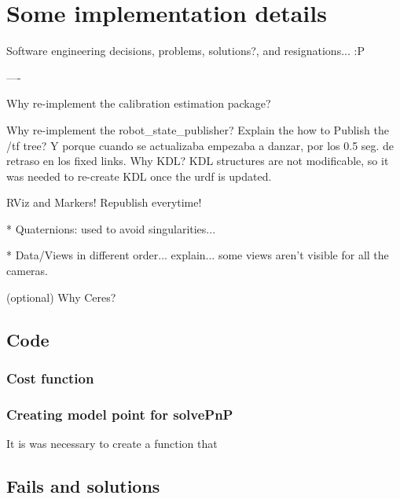 \chapter{Some implementation details}
\label{cha:implementation}

Software engineering decisions, problems, solutions?, and resignations... :P


----

Why re-implement the calibration estimation package?

Why re-implement the robot\_state\_publisher? Explain the how to Publish the /tf tree?
Y porque cuando se actualizaba empezaba a danzar, por los 0.5 seg. de retraso en los fixed links.
Why KDL? KDL structures are not modificable, so it was needed to re-create KDL once the urdf is updated.

RViz and Markers! Republish everytime!

* Quaternions: used to avoid singularities...

* Data/Views in different order... explain... some views aren't visible for all the cameras.

(optional)
Why Ceres?




\section{Code}
\subsection{Cost function}
\label{sec:ceres_impl}



\subsection{Creating model point for solvePnP}
\label{sec:solvePnP_impl}
It is was necessary to create a function that


\section{Fails and solutions}


